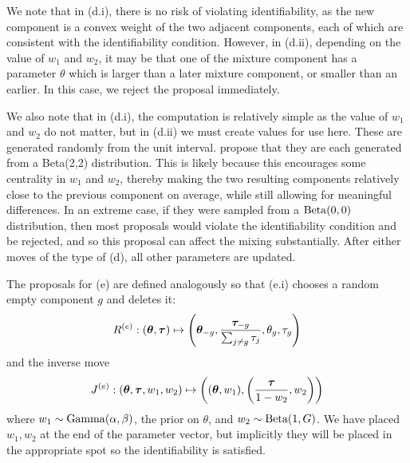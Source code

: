 \documentclass[twoside,12pt,bibstyle=chem-acs]{reedthesis}
\begin{document}
We note that in (d.i), there is no risk of violating identifiability, as the new component is a convex weight of the two adjacent components, each of which are consistent with the identifiability condition. However, in (d.ii), depending on the value of $w_1$ and $w_2$, it may be that one of the mixture component has a parameter $\theta$ which is larger than a later mixture component, or smaller than an earlier. In this case, we reject the proposal immediately.

We also note that in (d.i), the computation is relatively simple as the value of $w_1$ and $w_2$ do not matter, but in (d.ii) we must create values for use here. These are generated randomly from the unit interval. \citeauthor{richardson_bayesian_1997} propose that they are each generated from a Beta(2,2) distribution. This is likely because this encourages some centrality in $w_1$ and $w_2$, thereby making the two resulting components relatively close to the previous component on average, while still allowing for meaningful differences. In an extreme case, if they were sampled from a $\mathrm{Beta}(0,0)$ distribution, then most proposals would violate the identifiability condition and be rejected, and so this proposal can affect the mixing substantially. After either moves of the type of (d), all other parameters are updated.

The proposals for (e) are defined analogously so that (e.i) chooses a random empty component $g$ and deletes it:
\begin{equation*}
R^{(e)}: (\bm\theta, \bm{\tau}) \mapsto \left(\bm\theta_{-g}, \frac{\bm{\tau}_{-g}}{\sum_{j\neq g}\tau_j}, \theta_g, \tau_g\right)
\end{equation*}
and the inverse move
\begin{equation*}
J^{(e)}: (\bm\theta, \bm{\tau}, w_1, w_2) \mapsto \left((\bm\theta, w_1), \left(\frac{\bm{\tau}}{1-w_2}, w_2\right)\right)
\end{equation*}
where $w_1 \sim \mathrm{Gamma}(\alpha, \beta)$, the prior on $\theta$, and $w_2 \sim \mathrm{Beta}(1,G)$. We have placed $w_1, w_2$ at the end of the parameter vector, but implicitly they will be placed in the appropriate spot so the identifiability is satisfied.
\end{document}
